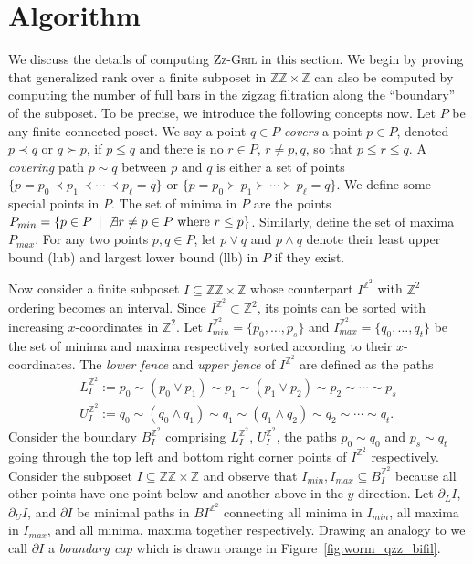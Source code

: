 \documentclass{article}
\newcommand{\zzgril}{\textsc{Zz-Gril}}
\newcommand{\zz}{\mathbb{ZZ}}
\newcommand{\z}{\mathbb{Z}}
\theoremstyle{plain}
\theoremstyle{definition}
\theoremstyle{remark}
\begin{document}
\section{Algorithm}
\label{sec:alg}
We discuss the details of computing \zzgril{} in this section. We begin by proving that generalized rank over a finite subposet in $\zz \times \z$ can also be computed by computing the number of full bars in the zigzag filtration along the ``boundary'' of the  subposet. To be precise, we introduce the following concepts now. Let $P$ be any finite connected poset. We say a point $q\in P$ \emph{covers} a point $p\in P$, denoted
$p\prec q$ or $q\succ p$, if $p\leq q$ and there is no $r\in P$, $r\not= p,q$, so that $p\leq r\leq q$. A \emph{covering} path $p\sim q$ between $p$
and $q$ is either a set of points $\{p=p_0\prec p_1\prec\cdots\prec p_\ell=q\}$ 
or $\{p=p_0\succ p_1\succ\cdots\succ p_\ell=q\}$.
We define some special points in $P$. The set of minima in $P$
are the points $P_{min}=\{p\in P\ \,|\, \not\exists r\not=p\in P \mbox{ where } r\leq p\}$. Similarly, define the set of maxima $P_{max}$. For any two points
$p,q\in P$, let $p\vee q$ and $p\wedge q$ denote their least upper bound (lub)
and largest lower bound (llb) in $P$ if they exist. 

Now consider a finite subposet $I\subseteq \zz\times \z$ whose
counterpart $I^{\z^2}$ with $\z^2$ ordering becomes an interval.
Since $I^{\z^2}\subset \z^2$, its points
can be sorted with increasing $x$-coordinates in $\z^2$. 
Let $I^{\z^2}_{min}=\{p_0,\ldots, p_s\}$
and $I^{\z^2}_{max}=\{q_0,\ldots, q_t\}$ be the set of minima and maxima respectively sorted
according to their $x$-coordinates. The \emph{lower fence} and \emph{upper fence}
of $I^{\z^2}$ are defined as the paths
\vspace{-0.1cm}
\begin{eqnarray*}
L_I^{\z^2}:=p_0\sim (p_0\vee p_1)\sim p_1\sim (p_1\vee p_2)\sim p_2\sim\cdots\sim p_s\\
U_I^{\z^2}:=q_0\sim (q_0\wedge q_1)\sim q_1\sim(q_1\wedge q_2)\sim q_2\sim\cdots\sim q_t.
\end{eqnarray*}
Consider the boundary $B_I^{\z^2}$ comprising $L_I^{\z^2}$, $U_I^{\z^2}$, the paths
$p_0\sim q_0$ and $p_s\sim q_t$ going through the top left and bottom right corner points
of $I^{\z^2}$ respectively. Consider the subposet $I\subseteq \zz\times\z$ and
observe that $I_{min}, I_{max}\subseteq B_I^{\z^2}$ because all other points
have one point below and another above in the $y$-direction.
Let $\partial_L I$, $\partial_U I$, and $\partial I$ be minimal
paths in $BI^{\z^2}$ connecting all minima in $I_{min}$, all maxima in $I_{max}$, and
all minima, maxima together respectively. Drawing an analogy to \cite{DKM24} we call
$\partial I$ a \emph{boundary cap} which is drawn orange in Figure~\ref{fig:worm_qzz_bifil}.
\end{document}

